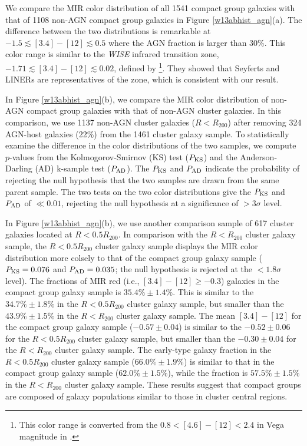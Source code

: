 \documentclass[12pt,preprint,apj]{emulateapj}
\newcommand{\rvir}{R_{200}}
\begin{document}
We compare the MIR color distribution of all 1541 compact group galaxies 
with that of 1108 non-AGN compact group galaxies in Figure \ref{w13abhist_agn}(a). 
The difference between the two distributions is remarkable at 
$-1.5\lesssim[3.4]-[12]\lesssim0.5$ where the AGN fraction is larger than 30\%.
This color range is similar to the \textit{WISE} infrared transition zone, 
$-1.71\lesssim[3.4]-[12]\lesssim0.02$, defined by \citet{alatalo+14}\footnote{
This color range is converted from the $0.8<[4.6]-[12]<2.4$ in Vega magnitude 
in \citet{alatalo+14}.}.
They showed that Seyferts and LINERs are representatives of the zone, 
which is consistent with our result. 

In Figure \ref{w13abhist_agn}(b), we compare the MIR color distribution 
of non-AGN compact group galaxies with that of non-AGN cluster galaxies. 
In this comparison, we use 1137 non-AGN cluster galaxies ($R<\rvir$) after removing 
324 AGN-host galaxies (22\%) from the 1461 cluster galaxy sample.
To statistically examine the difference in the color distributions of the two samples, 
we compute $p$-values from the Kolmogorov-Smirnov (KS) test ($P_{\rm KS}$) 
and the Anderson-Darling (AD) k-sample test ($P_{\rm AD}$). 
The $P_{\rm KS}$ and $P_{\rm AD}$ indicate the 
probability of rejecting the null hypothesis that the two samples are drawn from 
the same parent sample. The two tests on the two color distributions give 
the $P_{\rm KS}$ and $P_{\rm AD}$ of $\ll0.01$, rejecting the null hypothesis at a significance of $>3\sigma$ level.

In Figure \ref{w13abhist_agn}(b), we use another comparison sample of 
617 cluster galaxies located at $R<0.5\rvir$. 
In comparison with the $R<\rvir$ cluster galaxy sample, the $R<0.5\rvir$ cluster 
galaxy sample displays the MIR color distribution more colsely to that of 
the compact group galaxy sample ($P_{\rm KS}=0.076$ and $P_{\rm AD}=0.035$; 
the null hypothesis is rejected at the $<1.8\sigma$ level).
The fractions of MIR red (i.e., $[3.4]-[12]\geq-0.3$) galaxies in the compact group
galaxy sample is $35.4\%\pm1.4\%$. This is similar to the $34.7\%\pm1.8\%$ 
in the $R<0.5\rvir$ cluster galaxy sample, but smaller than the $43.9\%\pm1.5\%$ 
in the $R<\rvir$ cluster galaxy sample. The mean $[3.4]-[12]$ for the compact 
group galaxy sample ($-0.57\pm0.04$) is similar to the $-0.52\pm0.06$ for 
the $R<0.5\rvir$ cluster galaxy sample, but smaller than the $-0.30\pm0.04$ for the 
$R<\rvir$ cluster galaxy sample. 
The early-type galaxy fraction in the $R<0.5\rvir$ cluster galaxy sample 
($66.0\%\pm1.9\%$) is similar to that in the compact group galaxy sample 
($62.0\%\pm1.5\%$), while the fraction is $57.5\%\pm1.5\%$ in the $R<\rvir$ cluster 
galaxy sample.
These results suggest that compact groups are 
composed of galaxy populations similar to those in cluster central regions.
\end{document}
